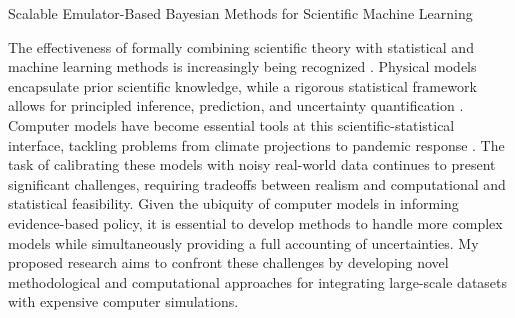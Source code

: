 \documentclass[11pt]{article}
\begin{document}
\begin{center}
Scalable Emulator-Based Bayesian Methods for Scientific Machine Learning
\end{center}

The effectiveness of formally combining scientific theory with statistical and machine learning methods is increasingly being recognized \cite{Willcox, Laubmeier, Wikle}. 
Physical models encapsulate prior scientific knowledge, while a rigorous statistical framework allows for principled inference, prediction, and uncertainty quantification \cite{Wikle}. Computer models have become essential tools at this scientific-statistical interface, tackling problems from 
climate projections \cite{Canadell} to pandemic response \cite{Swallow}. The task of calibrating these models with noisy real-world data continues to present
significant challenges, requiring tradeoffs between realism and computational and statistical feasibility. Given the ubiquity of computer models in informing
 evidence-based policy, it is essential to develop methods to handle more complex models while simultaneously providing a full accounting of uncertainties.
 My proposed research aims to confront these challenges by developing novel methodological and computational approaches for integrating large-scale datasets with expensive computer simulations. 
\end{document}

